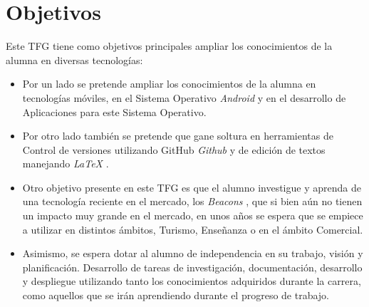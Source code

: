 %
%
%
%


\chapter{Objetivos} \label{chap:objetives}  

Este TFG tiene como objetivos principales ampliar los conocimientos de la alumna en diversas tecnologías:

	
\begin{itemize}
\item  	Por un lado se pretende ampliar los conocimientos de la alumna en tecnologías móviles, en el Sistema Operativo \textit{Android} \cite{URL::Android} y en el desarrollo de Aplicaciones para este Sistema Operativo.
\item Por otro lado también se pretende que gane soltura en herramientas de Control de versiones utilizando GitHub \textit{Github} \cite{URL::Github} y de edición de textos manejando \textit{LaTeX}  \cite{URL::LaTeX}.
\item Otro objetivo presente en este TFG es que el alumno investigue y aprenda de una tecnología reciente en el mercado, los \textit{Beacons} \cite{URL::Beacon} , que si bien aún no tienen un impacto muy grande en el mercado, en unos años se espera que se empiece a utilizar en distintos ámbitos, Turismo, Enseñanza o en el ámbito Comercial.
\item  Asimismo, se espera dotar al alumno de independencia en su trabajo, visión y planificación. Desarrollo de tareas de investigación, documentación, desarrollo y despliegue utilizando tanto los conocimientos adquiridos durante la carrera, como aquellos que se irán aprendiendo durante el progreso de trabajo.
\end{itemize}

